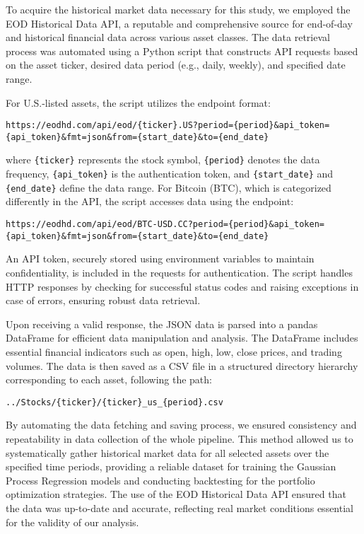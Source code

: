 To acquire the historical market data necessary for this study, we employed the EOD Historical Data API, a reputable and comprehensive source for end-of-day and historical financial data across various asset classes. The data retrieval process was automated using a Python script that constructs API requests based on the asset ticker, desired data period (e.g., daily, weekly), and specified date range.

For U.S.-listed assets, the script utilizes the endpoint format:

\begin{verbatim}
https://eodhd.com/api/eod/{ticker}.US?period={period}&api_token={api_token}&fmt=json&from={start_date}&to={end_date}
\end{verbatim}

where \texttt{\{ticker\}} represents the stock symbol, \texttt{\{period\}} denotes the data frequency, \texttt{\{api\_token\}} is the authentication token, and \texttt{\{start\_date\}} and \texttt{\{end\_date\}} define the data range. For Bitcoin (BTC), which is categorized differently in the API, the script accesses data using the endpoint:

\begin{verbatim}
https://eodhd.com/api/eod/BTC-USD.CC?period={period}&api_token={api_token}&fmt=json&from={start_date}&to={end_date}
\end{verbatim}

An API token, securely stored using environment variables to maintain confidentiality, is included in the requests for authentication. The script handles HTTP responses by checking for successful status codes and raising exceptions in case of errors, ensuring robust data retrieval.

Upon receiving a valid response, the JSON data is parsed into a pandas DataFrame for efficient data manipulation and analysis. The DataFrame includes essential financial indicators such as open, high, low, close prices, and trading volumes. The data is then saved as a CSV file in a structured directory hierarchy corresponding to each asset, following the path:

\begin{verbatim}
../Stocks/{ticker}/{ticker}_us_{period}.csv
\end{verbatim}

By automating the data fetching and saving process, we ensured consistency and repeatability in data collection of the whole pipeline. This method allowed us to systematically gather historical market data for all selected assets over the specified time periods, providing a reliable dataset for training the Gaussian Process Regression models and conducting backtesting for the portfolio optimization strategies. The use of the EOD Historical Data API ensured that the data was up-to-date and accurate, reflecting real market conditions essential for the validity of our analysis.

